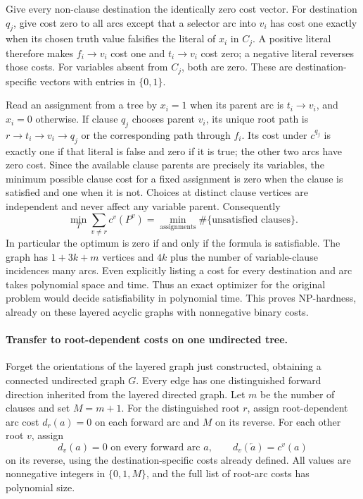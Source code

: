 \documentclass[11pt]{article}
\begin{document}
Give every non-clause destination the identically zero cost vector. For destination $q_j$, give cost zero to all arcs except that a selector arc into $v_i$ has cost one exactly when its chosen truth value falsifies the literal of $x_i$ in $C_j$. A positive literal therefore makes $f_i\to v_i$ cost one and $t_i\to v_i$ cost zero; a negative literal reverses those costs. For variables absent from $C_j$, both are zero. These are destination-specific vectors with entries in $\{0,1\}$.

Read an assignment from a tree by $x_i=1$ when its parent arc is $t_i\to v_i$, and $x_i=0$ otherwise. If clause $q_j$ chooses parent $v_i$, its unique root path is $r\to t_i\to v_i\to q_j$ or the corresponding path through $f_i$. Its cost under $c^{q_j}$ is exactly one if that literal is false and zero if it is true; the other two arcs have zero cost. Since the available clause parents are precisely its variables, the minimum possible clause cost for a fixed assignment is zero when the clause is satisfied and one when it is not. Choices at distinct clause vertices are independent and never affect any variable parent. Consequently
\[
\min_T\sum_{v\ne r}c^v(P^v)
=\min_{\text{assignments}}\#\{\text{unsatisfied clauses}\}.
\]
In particular the optimum is zero if and only if the formula is satisfiable. The graph has $1+3k+m$ vertices and $4k$ plus the number of variable-clause incidences many arcs. Even explicitly listing a cost for every destination and arc takes polynomial space and time. Thus an exact optimizer for the original problem would decide satisfiability in polynomial time. This proves NP-hardness, already on these layered acyclic graphs with nonnegative binary costs.
\paragraph{Transfer to root-dependent costs on one undirected tree.}
Forget the orientations of the layered graph just constructed, obtaining a connected undirected graph $G$. Every edge has one distinguished forward direction inherited from the layered directed graph. Let $m$ be the number of clauses and set $M=m+1$. For the distinguished root $r$, assign root-dependent arc cost $d_r(a)=0$ on each forward arc and $M$ on its reverse. For each other root $v$, assign
\[
d_v(a)=0\text{ on every forward arc }a,\qquad
d_v(\overleftarrow a)=c^v(a)
\]
on its reverse, using the destination-specific costs already defined. All values are nonnegative integers in $\{0,1,M\}$, and the full list of root-arc costs has polynomial size.
\end{document}
